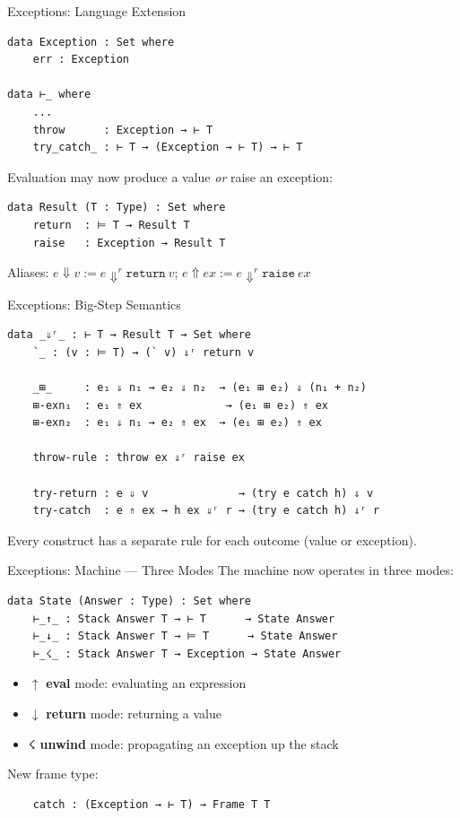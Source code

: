 \documentclass[10pt,compress,aspectratio=169]{beamer}
\begin{document}
\begin{frame}[fragile]{Exceptions: Language Extension}
\begin{verbatim}
data Exception : Set where
    err : Exception

data ⊢_ where
    ...
    throw      : Exception → ⊢ T
    try_catch_ : ⊢ T → (Exception → ⊢ T) → ⊢ T
\end{verbatim}

  Evaluation may now produce a value \emph{or} raise an exception:

\begin{verbatim}
data Result (T : Type) : Set where
    return  : ⊨ T → Result T
    raise   : Exception → Result T
\end{verbatim}

  Aliases: $e \Downarrow v := e \Downarrow^r \mathtt{return}\ v$; \quad $e \Uparrow ex := e \Downarrow^r \mathtt{raise}\ ex$
\end{frame}

\begin{frame}[fragile]{Exceptions: Big-Step Semantics}
\begin{verbatim}
data _⇓ʳ_ : ⊢ T → Result T → Set where
    `_ : (v : ⊨ T) → (` v) ⇓ʳ return v

    _⊞_     : e₁ ⇓ n₁ → e₂ ⇓ n₂  → (e₁ ⊞ e₂) ⇓ (n₁ + n₂)
    ⊞-exn₁  : e₁ ⇑ ex             → (e₁ ⊞ e₂) ⇑ ex
    ⊞-exn₂  : e₁ ⇓ n₁ → e₂ ⇑ ex  → (e₁ ⊞ e₂) ⇑ ex

    throw-rule : throw ex ⇓ʳ raise ex

    try-return : e ⇓ v              → (try e catch h) ⇓ v
    try-catch  : e ⇑ ex → h ex ⇓ʳ r → (try e catch h) ⇓ʳ r
\end{verbatim}
  Every construct has a separate rule for each outcome (value or exception).
\end{frame}

\begin{frame}[fragile]{Exceptions: Machine — Three Modes}
  The machine now operates in three modes:

\begin{verbatim}
data State (Answer : Type) : Set where
    ⊢_↑_ : Stack Answer T → ⊢ T      → State Answer
    ⊢_↓_ : Stack Answer T → ⊨ T      → State Answer
    ⊢_☇_ : Stack Answer T → Exception → State Answer
\end{verbatim}

  \begin{itemize}
    \item $\uparrow$ \textbf{eval} mode: evaluating an expression
    \item $\downarrow$ \textbf{return} mode: returning a value
    \item $\text{☇}$ \textbf{unwind} mode: propagating an exception up the stack
  \end{itemize}

  New frame type:
\begin{verbatim}
    catch : (Exception → ⊢ T) → Frame T T
\end{verbatim}
\end{frame}
\end{document}
